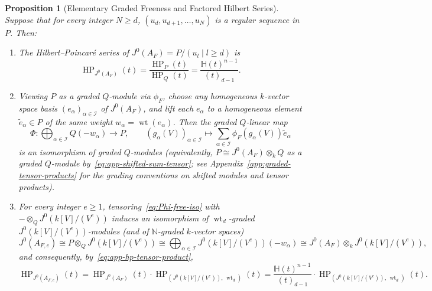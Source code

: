 \documentclass[a4paper, 12pt]{amsart}
\newtheorem{proposition}[theorem]{Proposition}
\theoremstyle{remark}
\begin{document}
\begin{proposition}[Elementary Graded Freeness and Factored Hilbert Series]
\label{prop:graded-freeness-finite}
Suppose that for every integer $N \ge d$,
$(u_d, u_{d + 1}, \dots, u_N)$ is a regular sequence in $P$.
Then:
\begin{enumerate}
  \item The Hilbert--Poincaré series of $J^0(A_F) = P / (u_l \mid l \ge d)$ is
  \begin{equation}
    \label{eq:HP-RF-quotient}
    \operatorname{HP}_{J^0(A_F)}(t) = \frac{\operatorname{HP}_{P}(t)}{\operatorname{HP}_{Q}(t)} = \frac{\mathbb{H}(t)^{n - 1}}{(t)_{d - 1}}.
  \end{equation}
  \item Viewing $P$ as a graded $Q$-module via $\phi_F$,
  choose any homogeneous $k$-vector space basis $(e_\alpha)_{\alpha \in \mathcal{I}}$ of $J^0(A_F)$,
  and lift each $e_\alpha$ to a homogeneous element $\tilde{e}_\alpha \in P$ of the same weight $w_\alpha = \operatorname{wt}(e_\alpha)$.
  Then the graded $Q$-linear map
  \begin{equation}
    \label{eq:Phi-free-iso}
    \Phi \colon \bigoplus_{\alpha \in \mathcal{I}} Q(-w_\alpha) \longrightarrow P, \qquad
    (g_\alpha(V))_{\alpha \in \mathcal{I}} \longmapsto \sum_{\alpha \in \mathcal{I}} \phi_F(g_\alpha(V)) \tilde{e}_\alpha
  \end{equation}
  is an isomorphism of graded $Q$-modules
  (equivalently, $P \cong J^0(A_F) \otimes_k Q$ as a graded $Q$-module by~\eqref{eq:app-shifted-sum-tensor};
  see Appendix~\ref{app:graded-tensor-products} for the grading conventions on shifted modules and tensor products).
  \item For every integer $e \ge 1$,
  tensoring~\eqref{eq:Phi-free-iso} with $- \otimes_{Q} J^0(k[V]/(V^e))$ induces an isomorphism of $\operatorname{wt}_d$-graded $J^0(k[V]/(V^e))$-modules (and of $\mathbb{N}$-graded $k$-vector spaces)
  \begin{equation}
    \label{eq:JN-direct-sum-BnN}
    J^0(A_{F, e}) \cong P \otimes_{Q} J^0\left(k[V]/(V^e)\right) \cong \bigoplus_{\alpha \in \mathcal{I}} J^0\left(k[V]/(V^e)\right)(-w_\alpha) \cong J^0(A_F) \otimes_k J^0\left(k[V]/(V^e)\right),
  \end{equation}
  and consequently,
  by~\eqref{eq:app-hp-tensor-product},
  \begin{equation}
    \label{eq:HP-JN-factored}
    \operatorname{HP}_{J^0(A_{F, e})}(t) = \operatorname{HP}_{J^0(A_F)}(t) \cdot \operatorname{HP}_{\left(J^0(k[V]/(V^e)), \, \operatorname{wt}_d\right)}(t) = \frac{\mathbb{H}(t)^{n - 1}}{(t)_{d - 1}} \cdot \operatorname{HP}_{\left(J^0(k[V]/(V^e)), \, \operatorname{wt}_d\right)}(t).
  \end{equation}
\end{enumerate}
\end{proposition}
\end{document}
